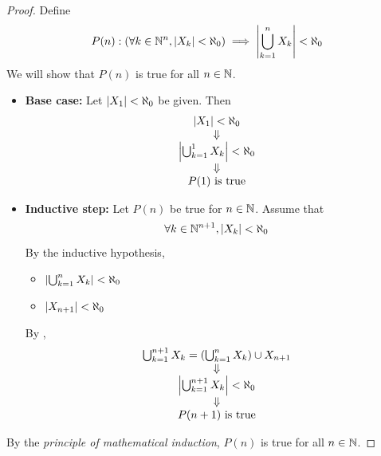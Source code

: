 \begin{proof}
    Define
    \[
    P(n): \paren*{\forall k \in \N^{n}, \abs*{X_{k}} < \aleph_{0}} \implies \abs*{\bigcup_{k = 1}^{n} X_{k}} < \aleph_{0}
    \]
    We will show that $P(n)$ is true for all $n \in \N$.
    \begin{itemize}
        \item \textbf{Base case:} Let $\abs*{X_{1}} < \aleph_{0}$ be given. Then
        \[
        \begin{array}{c}
            \abs*{X_{1}} < \aleph_{0} \\
            \Downarrow \\
            \abs*{\bigcup_{k = 1}^{1} X_{k}} < \aleph_{0} \\
            \Downarrow \\
            P(1) \text{ is true}
        \end{array}
        \]
        \item \textbf{Inductive step:} Let $P(n)$ be true for $n \in \N$. Assume that
        \[
        \forall k \in \N^{n + 1}, \abs*{X_{k}} < \aleph_{0}
        \]
        By the inductive hypothesis,
        \begin{itemize}
            \item $\abs*{\bigcup_{k = 1}^{n} X_{k}} < \aleph_{0}$
            \item $\abs*{X_{n + 1}} < \aleph_{0}$
        \end{itemize}
        By ,
        \[
        \begin{array}{c}
            \bigcup_{k = 1}^{n + 1} X_{k} = \paren*{\bigcup_{k = 1}^{n} X_{k}} \cup X_{n + 1} \\
            \Downarrow \\
            \abs*{\bigcup_{k = 1}^{n + 1} X_{k}} < \aleph_{0} \\
            \Downarrow \\
            P(n + 1) \text{ is true}
        \end{array}
        \]
    \end{itemize}
    By the \emph{principle of mathematical induction}, $P(n)$ is true for all $n \in \N$.
\end{proof}
